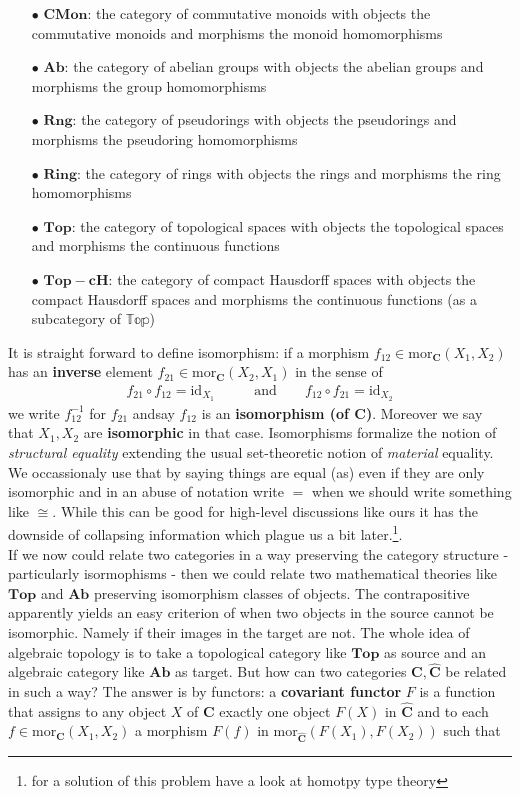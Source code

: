 \begin{enumerate}
\item[$\bullet$]
  $\mathbf{CMon}$: the category of commutative monoids with objects the commutative monoids and morphisms the monoid homomorphisms
\item[$\bullet$]
  $\mathbf{Ab}$: the category of abelian groups with objects the abelian groups and morphisms the group homomorphisms
\item[$\bullet$]
  $\mathbf{Rng}$: the category of pseudorings with objects the pseudorings and morphisms the pseudoring homomorphisms
\item[$\bullet$]
  $\mathbf{Ring}$: the category of rings with objects the rings and morphisms the ring homomorphisms
\item[$\bullet$]
  $\mathbf{Top}$: the category of topological spaces with objects the topological spaces and morphisms the continuous functions
\item[$\bullet$]
  $\mathbf{Top-cH}$: the category of compact Hausdorff spaces with objects the compact Hausdorff spaces and morphisms the continuous functions (as a subcategory of $\mathbb{Top}$)
\end{enumerate}
It is straight forward to define isomorphism: if a morphism $f_{12} \in \mathrm{mor}_{\mathbf{C}}(X_{1},X_{2})$ has an \textbf{inverse} element $f_{21} \in \mathrm{mor}_{\mathbf{C}}(X_{2},X_{1})$ in the sense of
\begin{align*}
  f_{21}
  \circ
  f_{12}
  =
  \mathrm{id}_{X_{1}}
  \qquad
  &\text{and}
  \qquad
  f_{12}
  \circ
  f_{21}
  =
  \mathrm{id}_{X_{2}}
\end{align*}
we write $f_{12}^{-1}$ for $f_{21}$ andsay $f_{12}$ is an \textbf{isomorphism (of $\mathbf{C}$)}. Moreover we say that $X_{1},X_{2}$ are \textbf{isomorphic} in that case. Isomorphisms formalize the notion of \textit{structural equality} extending the usual set-theoretic notion of \textit{material} equality. We occassionaly use that by saying things are {\glqq}equal (as){\grqq} even if they are only isomorphic and in an abuse of notation write $=$ when we should write something like $\cong$. While this can be good for high-level discussions like ours it has the downside of collapsing information which plague us a bit later.\footnote{for a solution of this problem have a look at homotpy type theory}.
\\
If we now could relate two categories in a way preserving the category structure - particularly isormophisms - then we could relate two mathematical theories like $\mathbf{Top}$ and $\mathbf{Ab}$ preserving isomorphism classes of objects. The contrapositive apparently yields an easy criterion of when two objects in the source cannot be isomorphic. Namely if their images in the target are not. The whole idea of algebraic topology is to take a topological category like $\mathbf{Top}$ as source and an algebraic category like $\mathbf{Ab}$ as target. But how can two categories $\mathbf{C},\hat{\mathbf{C}}$ be related in such a way? The answer is by functors: a \textbf{covariant functor} $F$ is a function that assigns to any object $X$ of $\mathbf{C}$ exactly one object $F(X)$ in $\hat{\mathbf{C}}$ and to each $f \in \mathrm{mor}_{\mathbf{C}}(X_{1},X_{2})$ a morphism $F(f)$ in $\mathrm{mor}_{\hat{\mathbf{C}}}(F(X_{1}),F(X_{2}))$ such that
